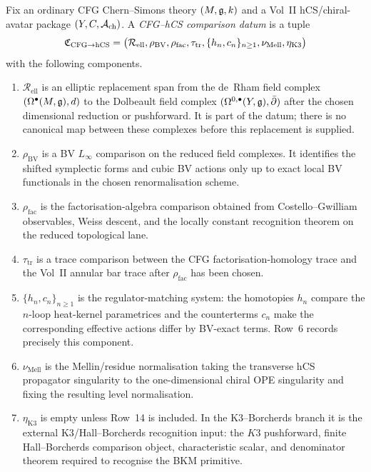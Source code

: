 \begin{definition}
\label{def:cfg-hcs-comparison-datum}
Fix an ordinary CFG Chern--Simons theory
$(M,\mathfrak{g},k)$ and a Vol~II hCS/chiral-avatar package
$(Y,C,\mathcal{A}_{\mathrm{ch}})$. A \emph{CFG--hCS comparison datum} is a
tuple
\[
\mathfrak C_{\mathrm{CFG}\to\mathrm{hCS}}
=
\bigl(
\mathcal R_{\mathrm{ell}},
\rho_{\mathrm{BV}},
\rho_{\mathrm{fac}},
\tau_{\mathrm{tr}},
\{h_n,c_n\}_{n\ge 1},
\nu_{\mathrm{Mell}},
\eta_{\mathrm{K3}}
\bigr)
\]
with the following components.

\begin{enumerate}
\item $\mathcal R_{\mathrm{ell}}$ is an elliptic replacement span
from the de~Rham field complex
$(\Omega^\bullet(M,\mathfrak{g}),d)$ to the Dolbeault field complex
$(\Omega^{0,\bullet}(Y,\mathfrak{g}),\bar\partial)$ after the chosen dimensional reduction or
pushforward. It is part of the datum; there is no canonical map between
these complexes before this replacement is supplied.
\item $\rho_{\mathrm{BV}}$ is a BV $L_\infty$ comparison on the reduced
field complexes. It identifies the shifted symplectic forms and cubic
BV actions only up to exact local BV functionals in the chosen
renormalisation scheme.
\item $\rho_{\mathrm{fac}}$ is the factorisation-algebra comparison
obtained from Costello--Gwilliam observables, Weiss descent, and the
locally constant recognition theorem on the reduced topological lane.
\item $\tau_{\mathrm{tr}}$ is a trace comparison between the CFG
factorisation-homology trace and the Vol~II annular bar trace after
$\rho_{\mathrm{fac}}$ has been chosen.
\item $\{h_n,c_n\}_{n\ge 1}$ is the regulator-matching system: the
homotopies \(h_n\) compare the $n$-loop heat-kernel parametrices and
the counterterms \(c_n\) make the corresponding effective actions
differ by BV-exact terms. Row~6 records precisely this component.
\item $\nu_{\mathrm{Mell}}$ is the Mellin/residue normalisation taking
the transverse hCS propagator singularity to the one-dimensional
chiral OPE singularity and fixing the resulting level normalisation.
\item $\eta_{\mathrm{K3}}$ is empty unless Row~14 is included. In the
K3--Borcherds branch it is the external K3/Hall--Borcherds recognition
input: the $K3$ pushforward, finite Hall--Borcherds comparison object,
characteristic scalar, and denominator theorem required to recognise
the BKM primitive.
\end{enumerate}


\end{definition}
